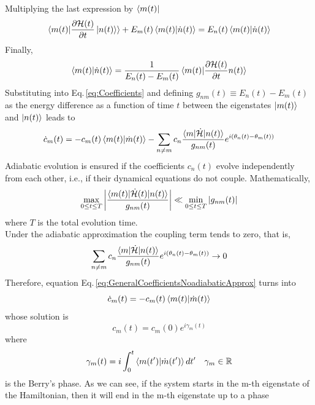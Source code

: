 Multiplying the last expression by $\bra{m(t)}$ 
\begin{equation}
    \braket{m(t)|\frac{\partial\mathcal{H}(t)}{\partial t}\ket{n(t)}} + E_{m}(t)\braket{m(t)|\dot{n}(t)} = E_{n}(t)\braket{m(t)|\dot{n}(t)}
\end{equation}
Finally,
\begin{equation}
    \braket{m(t)|\dot{n}(t)} = \frac{1}{E_{n}(t)-E_{m}(t)}\braket{m(t)|\frac{\partial \mathcal{H}(t)}{\partial t}n(t)}
\end{equation}
Substituting into Eq.\,\eqref{eq:Coefficients} and defining $g_{nm}(t)\equiv E_{n}(t) - E_{m}(t)$ as the energy difference as a function of time $t$ between the eigenstates $\ket{m(t)}$ and $\ket{n(t)}$ leads to
\begin{equation}
\label{eq:GeneralCoefficientsNoadiabaticApprox}
    \dot{c}_{m}(t) = -c_{m}(t) \braket{m(t)|\dot{m}(t)} - \sum_{n\neq m} c_{n}\frac{\braket{m|\dot{\mathcal{H}}|n(t)}}{g_{nm}(t)}e^{i\left(\theta_{n}(t) - \theta_{m}(t)\right)}
\end{equation}
Adiabatic evolution is ensured if the coefficients $c_{n}(t)$ evolve independently from each other, i.e., if their dynamical equations do not couple. Mathematically,
\begin{equation}
    \max_{0 \leq t \leq T} \abs{\frac{\braket{m(t)|\dot{\mathcal{H}}(t)|n(t)}}{g_{nm}(t)}} \ll \min_{0\leq t \leq T} \abs{g_{nm}(t)}
\end{equation}
where $T$ is the total evolution time.\\ 
Under the adiabatic approximation the coupling term tends to zero, that is,
\begin{equation}
    \sum_{n\neq m} c_{n}\frac{\braket{m|\dot{\mathcal{H}}|n(t)}}{g_{nm}(t)}e^{i\left(\theta_{n}(t) - \theta_{m}(t)\right)} \to 0
\end{equation}
Therefore, equation Eq.\,\eqref{eq:GeneralCoefficientsNoadiabaticApprox} turns into
\begin{equation}
    \dot{c}_{m}(t) = -c_{m}(t)\braket{m(t)|\dot{m}(t)}
\end{equation}
whose solution is
\begin{equation}
    c_{m}(t) = c_{m}(0)e^{i\gamma_{m}(t)}
\end{equation}
where
\begin{equation}
    \gamma_{m}(t) = i\int_{0}^{t}\braket{m(t^{\prime})|\dot{m}(t^{\prime})}dt^{\prime} \quad \gamma_{m}\in \mathbb{R}
\end{equation}
is the Berry's phase. As we can see, if the system starts in the m-th eigenstate of the Hamiltonian, then it will end in the m-th eigenstate up to a phase
